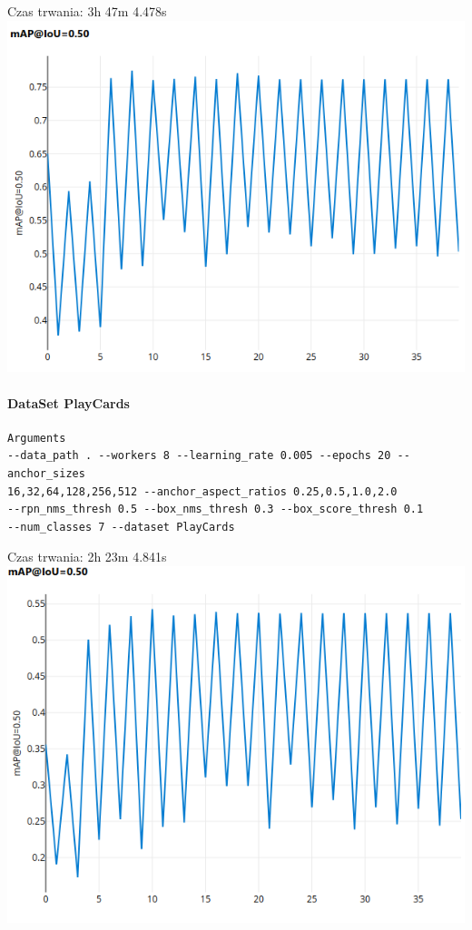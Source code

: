 \documentclass[11pt]{article}
\begin{document}
Czas trwania: 3h 47m 4.478s\newline
\includegraphics{image_report/metrik_monkeycats.png}

\hypertarget{dataset-playcards}{%
\paragraph{DataSet PlayCards}\label{dataset-playcards}}

\begin{verbatim}
Arguments
--data_path . --workers 8 --learning_rate 0.005 --epochs 20 --anchor_sizes
16,32,64,128,256,512 --anchor_aspect_ratios 0.25,0.5,1.0,2.0 
--rpn_nms_thresh 0.5 --box_nms_thresh 0.3 --box_score_thresh 0.1 
--num_classes 7 --dataset PlayCards
\end{verbatim}

Czas trwania: 2h 23m 4.841s\newline
\includegraphics{image_report/metrik_cards.png}
\end{document}
